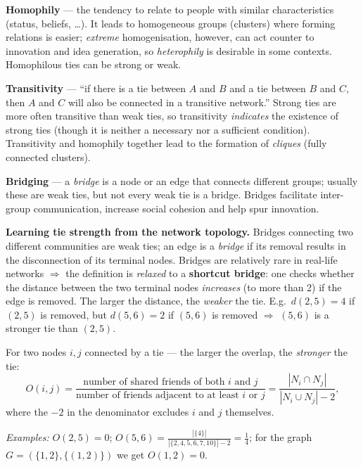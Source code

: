 \documentclass[11pt,a4paper]{article}
\theoremstyle{definition}
\providecommand{\uv}[1]{``#1''}
\begin{document}
\begin{defbox}
\textbf{Homophily} --- the tendency to relate to people with similar characteristics (status,
beliefs, \dots). It leads to homogeneous groups (clusters) where forming relations is easier;
\emph{extreme} homogenisation, however, can act counter to innovation and idea generation, so
\emph{heterophily} is desirable in some contexts. Homophilous ties can be strong or weak.

\textbf{Transitivity} --- \uv{if there is a tie between $A$ and $B$ and a tie between $B$ and $C$,
then $A$ and $C$ will also be connected in a transitive network.} Strong ties are more often
transitive than weak ties, so transitivity \emph{indicates} the existence of strong ties (though it
is neither a necessary nor a sufficient condition). Transitivity and homophily together lead to the
formation of \emph{cliques} (fully connected clusters).

\textbf{Bridging} --- a \emph{bridge} is a node or an edge that connects different groups; usually
these are weak ties, but not every weak tie is a bridge. Bridges facilitate inter-group
communication, increase social cohesion and help spur innovation.
\end{defbox}

\textbf{Learning tie strength from the network topology.} Bridges connecting two different
communities are weak ties; an edge is a \emph{bridge} if its removal results in the disconnection of
its terminal nodes. Bridges are relatively rare in real-life networks $\Rightarrow$ the definition
is \emph{relaxed} to a \textbf{shortcut bridge}: one checks whether the distance between the two
terminal nodes \emph{increases} (to more than 2) if the edge is removed. The larger the distance, the
\emph{weaker} the tie. E.g.\ $d(2,5)=4$ if $(2,5)$ is removed, but $d(5,6)=2$ if $(5,6)$ is removed
$\Rightarrow$ $(5,6)$ is a stronger tie than $(2,5)$.

\begin{defbox}
For two nodes $i,j$ connected by a tie --- the larger the overlap, the \emph{stronger} the tie:
\[ O(i,j)=\frac{\text{number of shared friends of both } i \text{ and } j}
   {\text{number of friends adjacent to at least }i\text{ or }j}
   =\frac{|N_i\cap N_j|}{|N_i\cup N_j|-2}, \]
where the $-2$ in the denominator excludes $i$ and $j$ themselves.

\emph{Examples:} $O(2,5)=0$; $O(5,6)=\frac{|\{4\}|}{|\{2,4,5,6,7,10\}|-2}=\frac14$; for the graph
$G=(\{1,2\},\{(1,2)\})$ we get $O(1,2)=0$.
\end{defbox}
\end{document}
